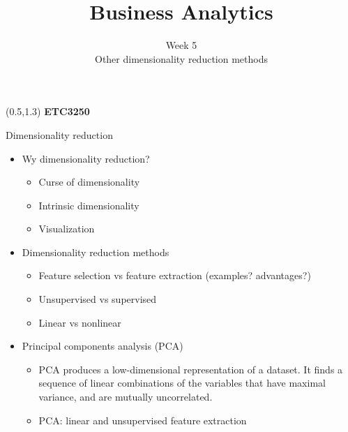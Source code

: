 \documentclass[14pt]{beamer}
\title[5. Other dimensionality reduction methods]{Business Analytics}
\author{Week 5\\ Other dimensionality reduction methods}
\begin{document}
\begin{frame}[plain]{}
\maketitle
\begin{textblock}{11}(0.5,1.3){\color{white}\large
\textbf{ETC3250}}
\end{textblock}
\end{frame}


\begin{frame}{Dimensionality reduction}\large

\begin{itemize}
\item Wy dimensionality reduction?
\begin{itemize}
	\item Curse of dimensionality
	\item Intrinsic dimensionality
	\item Visualization
\end{itemize}
\pause
\item Dimensionality reduction methods
\begin{itemize}
\item Feature selection vs feature extraction (examples? advantages?)
\item Unsupervised vs supervised
\item Linear vs nonlinear
\end{itemize}
\pause
\item Principal components analysis (PCA)
\begin{itemize}
\item PCA produces a low-dimensional representation of a dataset. It finds a sequence of linear combinations of the variables that have maximal variance, and are mutually uncorrelated.
\item PCA: linear and unsupervised feature extraction
\end{itemize}

\end{itemize}


\end{frame}
\end{document}
